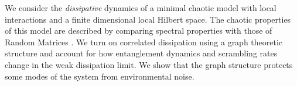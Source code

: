 \documentclass[aps,pra,reprint,amsmath,amssymb]{revtex4-2}
\newcommand{\hsys}[0]{H_{\text{sys}}}
\begin{document}
We consider the \textit{dissipative} dynamics of a minimal chaotic model \cite{prosen2002general,prosen2002ruelle,prosen2007chaos} with local interactions and a finite dimensional local Hilbert space. The chaotic properties of this model are described by comparing spectral properties with those of Random Matrices \cite{pineda2007universal}. We turn on correlated dissipation using a graph theoretic structure and account for how entanglement dynamics and scrambling rates change in the weak dissipation limit. We show that the graph structure protects some modes of the system from environmental noise. 
\end{document}
